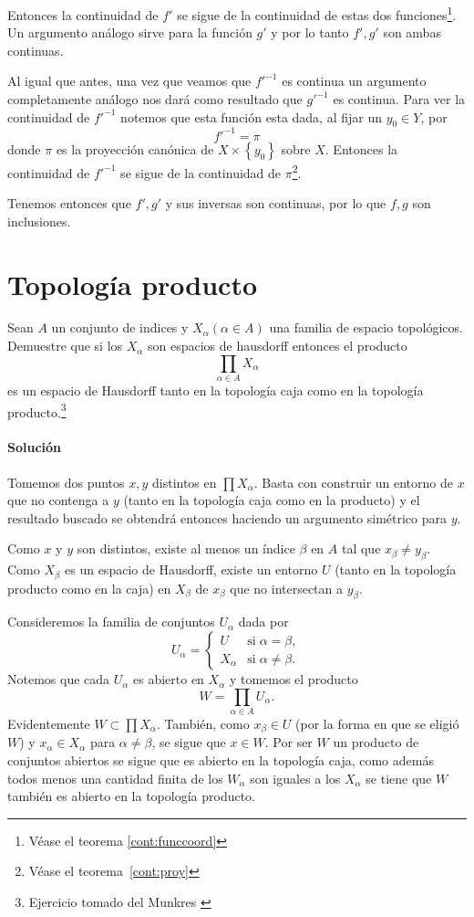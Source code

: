 \documentclass[letterpaper,10pt,final]{article}
\begin{document}
Entonces la continuidad de $f'$ se sigue de la
continuidad de estas dos funciones\footnote{Véase el teorema \ref{cont:funccoord}}. Un argumento
análogo sirve para la función $g'$ y por lo tanto
$f',g'$ son ambas continuas.

Al igual que antes, una vez que veamos que $f'^{-1}$ es
continua un argumento completamente análogo nos dará
como resultado que $g'^{-1}$ es continua. Para ver la
continuidad de $f'^{-1}$ notemos que esta función esta
dada, al fijar un $y_0\in Y$, por
\[
f'^{-1}=\pi	
\]
donde $\pi$ es la proyección canónica de $X\times\left\{ y_0 \right\}$
sobre $X$. Entonces la continuidad de $f'^{-1}$ se
sigue de la continuidad de $\pi$\footnote{Véase el teorema~\ref{cont:proy}}.

Tenemos entonces que $f',g'$ y sus inversas son
continuas, por lo que $f,g$ son inclusiones.

\section{Topología producto}\label{sec:prod}

Sean $A$ un conjunto de indices y $X_{\alpha} (\alpha\in A)$ una familia de espacio topológicos.
Demuestre que si los $X_{\alpha}$ son espacios de hausdorff
entonces el producto
\[
\prod_{\alpha\in A} X_{\alpha}
\]
es un espacio de Hausdorff tanto en la topología caja como en la topología producto.\footnote{Ejercicio tomado del Munkres \cite[\S19, Nº 3]{munkres_topology_2014}}

\paragraph{Solución}

Tomemos dos puntos $x,y$ distintos en $\prod X_{\alpha}$. Basta con construir
un entorno de $x$ que no contenga a $y$ (tanto en la topología caja como en la producto)
y el resultado buscado se obtendrá entonces haciendo un argumento simétrico para $y$.

Como $x$ y $y$ son distintos,
existe al menos un índice $\beta$ en $A$ tal que $x_{\beta}\neq y_{\beta}$.
Como $X_{\beta}$ es un espacio de Hausdorff, existe  un entorno $U$
(tanto en la topología producto como en la caja)
en $X_{\beta}$ de $x_{\beta}$ que no intersectan a $y_{\beta}$.

Consideremos la familia de conjuntos $U_\alpha$ dada por
\[
U_{\alpha}=
\begin{cases}
	U &\text{si}\;\alpha=\beta,\\
	X_\alpha &\text{si}\;\alpha\neq \beta.
\end{cases}
\]
Notemos que cada $U_\alpha$ es abierto en $X_\alpha$ y tomemos el producto
\[
W=\prod_{\alpha\in A} U_\alpha.
\]
Evidentemente $W\subset\prod X_{\alpha}$. También, como $x_{\beta}\in U$ 
(por la forma en que se eligió $W$) y $x_\alpha\in X_{\alpha}$ para
$\alpha\neq\beta$, se sigue que $x\in W$. Por ser $W$ un producto
de conjuntos abiertos se sigue que es abierto en la topología
caja, como además todos menos una cantidad finita de los 
$W_\alpha$ son iguales a los $X_\alpha$ se tiene que $W$ también
es abierto en la topología producto.
\end{document}
